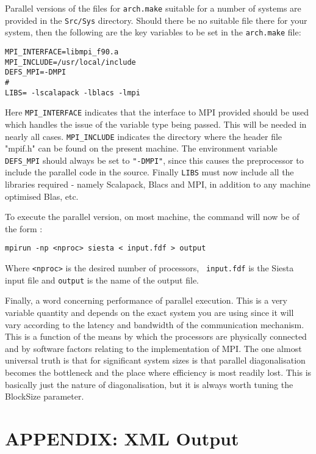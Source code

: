 \documentclass[11pt]{article}
\begin{document}
\noindent
Parallel versions of the files for {\tt arch.make} suitable for a
number of systems are provided in the {\tt Src/Sys} directory. Should
there be no suitable file there for your system, then the following
are the key variables to be set in the {\tt arch.make} file:

\begin{verbatim}
MPI_INTERFACE=libmpi_f90.a
MPI_INCLUDE=/usr/local/include
DEFS_MPI=-DMPI
#
LIBS= -lscalapack -lblacs -lmpi
\end{verbatim}

Here {\tt MPI\_INTERFACE} indicates that the interface to MPI provided
should be used which handles the issue of the variable type being
passed. This will be needed in nearly all cases. {\tt MPI\_INCLUDE}
indicates the directory where the header file "mpif.h" can be found on
the present machine. The environment variable {\tt DEFS\_MPI} should always
be set to {\tt "-DMPI"}, since this causes the preprocessor to include the
parallel code in the source. Finally {\tt LIBS} must now include all the
libraries required - namely Scalapack, Blacs and MPI, in addition to
any machine optimised Blas, etc.

To execute the parallel version, on most machine, the command will now
be of the form :

{\tt mpirun -np <nproc> siesta < input.fdf > output}

Where {\tt <nproc>} is the desired number of processors, {\tt
input.fdf} is the {\sc Siesta} input file and {\tt output} is the name
of the output file.

Finally, a word concerning performance of parallel execution. This is
a very variable quantity and depends on the exact system you are using
since it will vary according to the latency and bandwidth of the
communication mechanism.  This is a function of the means by which the
processors are physically connected and by software factors relating
to the implementation of MPI. The one almost universal truth is that
for significant system sizes is that parallel diagonalisation becomes
the bottleneck and the place where efficiency is most readily
lost. This is basically just the nature of diagonalisation, but it is
always worth tuning the BlockSize parameter.

\newpage
\section{APPENDIX: XML Output}
\end{document}
